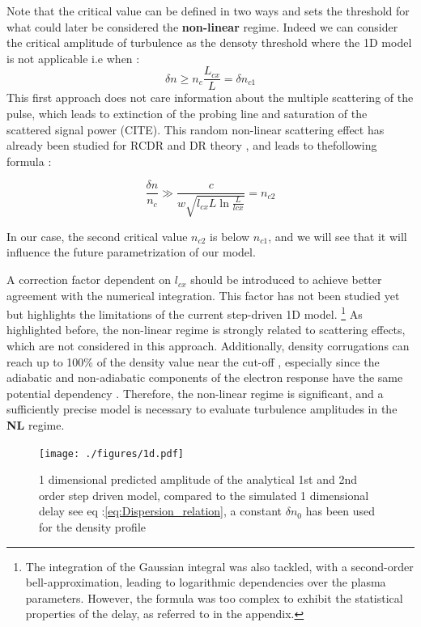 \documentclass[11pt,a4paper,openany]{report}
\begin{document}
\begin{multicols}{2}
    Note that the critical value can be defined in two ways \cite{SPR_Krutkin, PUT} and sets the threshold for what could later be considered the \textbf{non-linear} regime. Indeed we can consider the critical amplitude of turbulence as the densoty threshold where the 1D model is not applicable i.e when : $$\delta n \geq n_c \frac{L_{cx}}{L} = \delta n_{c 1}$$ This first approach does not care information about the multiple scattering of the pulse, which leads to extinction of the probing line and saturation of the scattered signal power (CITE). This random non-linear scattering effect has already been studied for RCDR and DR theory \cite{critical2}, and leads to thefollowing formula :

    $$ \frac{\delta n}{n_c} \gg  \frac{c}{w\sqrt{l_{cx}L\ln{\frac{L}{lcx}}}} = n_{c2}$$

    In our case, the second critical value $n_{c 2}$ is below $n_{c 1}$, and we will see that it will influence the future parametrization of our model.

    A correction factor dependent on $l_{cx}$ should be introduced to achieve better agreement with the numerical integration. This factor has not been studied yet but highlights the limitations of the current step-driven 1D model. \footnote{The integration of the Gaussian integral was also tackled, with a second-order bell-approximation, leading to logarithmic dependencies over the plasma parameters. However, the formula was too complex to exhibit the statistical properties of the delay, as referred to in the appendix.} As highlighted before, the non-linear regime is strongly related to scattering effects, which are not considered in this approach. Additionally, density corrugations can reach up to 100\% of the density value near the cut-off \cite{Krutkin_thesis,San_diego}, especially since the adiabatic and non-adiabatic components of the electron response have the same potential dependency \cite{San_diego}. Therefore, the non-linear regime is significant, and a sufficiently precise model is necessary to evaluate turbulence amplitudes in the \textbf{NL} regime.

    \begin{figure}[H]
        \centering
        \hspace*{-1.45cm}\texttt{[image: ./figures/1d.pdf]}
        \caption{1 dimensional predicted amplitude of the analytical 1st and 2nd order step driven model, compared to the simulated 1 dimensional delay see eq :\ref{eq:Dispersion_relation}, a constant $\delta n_0$ has been used for the density profile}
        \label{fig:std_delay}
    \end{figure}


\end{multicols}
\end{document}
